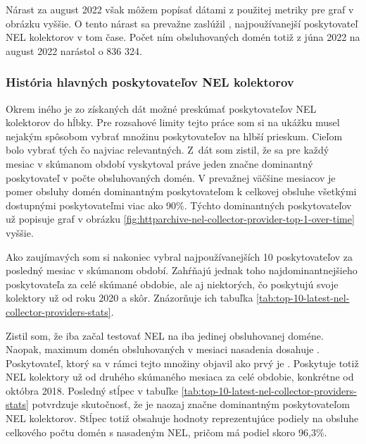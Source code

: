 \pagebreak

Nárast za august 2022 však môžem popísať dátami z použitej metriky pre graf v obrázku vyššie.
O tento nárast sa prevažne zaslúžil , najpoužívanejší poskytovateľ NEL kolektorov v tom čase. 
Počet ním obsluhovaných domén totiž z júna 2022 na august 2022 narástol o 836 324.

\subsubsection{História hlavných poskytovateľov NEL kolektorov}

Okrem iného je zo získaných dát možné preskúmať poskytovateľov NEL kolektorov do hĺbky.
Pre rozsahové limity tejto práce som si na ukážku musel nejakým spôsobom vybrať množinu poskytovateľov na hlbší prieskum.
Cieľom bolo vybrať tých čo najviac relevantných.
\mbox{Z dát} som zistil, že sa pre každý mesiac v skúmanom období vyskytoval práve jeden značne dominantný poskytovateľ v počte obsluhovaných domén.
V prevažnej väčšine mesiacov je pomer obsluhy domén dominantným poskytovateľom k celkovej obsluhe všetkými dostupnými poskytovateľmi viac ako 90\%.
Týchto dominantných poskytovateľov už popisuje graf v obrázku \ref{fig:httparchive-nel-collector-provider-top-1-over-time} vyššie.

Ako zaujímavých som si nakoniec vybral najpoužívanejších 10 poskytovateľov za posledný mesiac v skúmanom období.
Zahŕňajú jednak toho najdominantnejšieho poskytovateľa za celé skúmané obdobie, ale aj niektorých, čo poskytujú svoje kolektory už od roku 2020 a skôr.
Znázorňuje ich tabuľka \ref{tab:top-10-latest-nel-collector-providers-stats}.

Zistil som, že iba  začal testovať NEL na iba jedinej obsluhovanej doméne. Naopak, maximum domén obsluhovaných v mesiaci nasadenia dosahuje .
Poskytovateľ, ktorý sa v rámci tejto množiny objavil ako prvý je .
Poskytuje totiž NEL kolektory už od druhého skúmaného mesiaca za celé obdobie, konkrétne od októbra 2018.
Posledný stĺpec v tabuľke \ref{tab:top-10-latest-nel-collector-providers-stats} potvrdzuje skutočnosť, že  je naozaj značne dominantným poskytovateľom NEL kolektorov.
Stĺpec totiž obsahuje hodnoty reprezentujúce podiely na obsluhe celkového počtu domén s nasadeným NEL, pričom  má podiel skoro 96,3\%.

